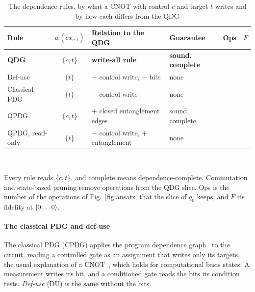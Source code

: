 \begin{table}[t]
  \centering
  \caption{The dependence rules, by what a CNOT with control $c$ and target $t$ writes and by how each differs from
  the QDG}
  \label{tab:rules}
  \footnotesize\setlength{\tabcolsep}{2.6pt}\renewcommand{\arraystretch}{1.12}
  \begin{tabular}{@{}l c >{\raggedright\arraybackslash}p{2.05cm} >{\raggedright\arraybackslash}p{1.38cm} r r@{}}
    \toprule
    \textbf{Rule} & $w(\mathit{cx}_{c,t})$ & \textbf{Relation to the QDG} & \textbf{Guarantee} & \textbf{Ops} & $F$ \\
    \midrule
    \rowcolor{blue!7}\textbf{QDG} & $\{c, t\}$ & \textbf{write-all rule} & \textbf{sound, complete} & \numAnsWireOps{} & \numAnsQdgFidelity{} \\
    \midrule
    Def-use & $\{t\}$ & $-$ control write, $-$ bits & none & \numAnsDuOps{} & \numAnsDuFidelity{} \\
    Classical PDG & $\{t\}$ & $-$ control write & none & \numAnsCpdgOps{} & \numAnsCpdgFidelity{} \\
    QPDG~\cite{yu2025qpdg} & $\{c, t\}$ & $+$ closed entanglement edges & sound, complete & \numAnsYzOps{} & \numAnsYzFidelity{} \\
    QPDG, read-only & $\{t\}$ & $-$ control write, $+$ entanglement & none & \numAnsYzroOps{} & \numAnsYzroFidelity{} \\
    \bottomrule
  \end{tabular}\\[3pt]
  \begin{minipage}{\columnwidth}\footnotesize
  Every rule reads $\{c, t\}$, and complete means dependence-complete. Commutation and state-based pruning remove
  operations from the QDG slice. Ops is the number of the \numAnsOps{} operations of Fig.~\ref{fig:ansatz} that the
  slice of $q_0$ keeps, and $F$ its fidelity at $\lvert 0\dots0\rangle$.
  \end{minipage}
\end{table}

\paragraph*{The classical PDG and def-use}
The classical PDG (CPDG) applies the program dependence graph~\cite{ferrante1987pdg} to the circuit, reading a
controlled gate as an assignment that writes only its targets, the usual explanation of a CNOT~\cite{ramalho2025road},
which holds for computational basis states. A measurement writes its bit, and a conditioned gate reads the bits its
condition tests. \emph{Def-use} (DU) is the same without the bits.

